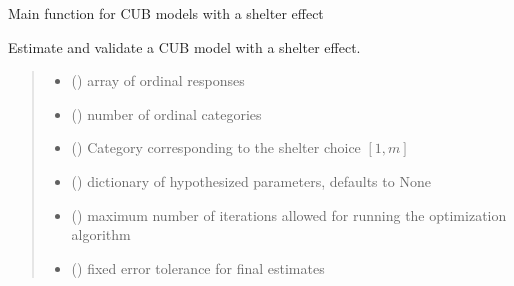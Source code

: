 \documentclass[letterpaper,10pt,english]{sphinxmanual}
\begin{document}

\begin{fulllineitems}
\label{\detokenize{cubmods:cubmods.cubsh.mle}}
\pysigstartsignatures
{}
\pysigstopsignatures
\sphinxAtStartPar
Main function for CUB models with a shelter effect

\sphinxAtStartPar
Estimate and validate a CUB model with a shelter effect.
\begin{quote}\begin{description}
\begin{itemize}
\item {} 
\sphinxAtStartPar
{} () \textendash{} array of ordinal responses

\item {} 
\sphinxAtStartPar
{} () \textendash{} number of ordinal categories

\item {} 
\sphinxAtStartPar
{} () \textendash{} Category corresponding to the shelter choice \([1,m]\)

\item {} 
\sphinxAtStartPar
{} (\sphinxstyleliteralemphasis{\sphinxupquote{, }}) \textendash{} dictionary of hypothesized parameters, defaults to None

\item {} 
\sphinxAtStartPar
{} () \textendash{} maximum number of iterations allowed for running the optimization algorithm

\item {} 
\sphinxAtStartPar
{} () \textendash{} fixed error tolerance for final estimates


\end{itemize}
\end{description}
\end{quote}
\end{fulllineitems}
\end{document}
